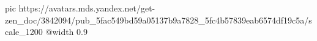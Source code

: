  
 
 
 
 

\ifcmt
  pic https://avatars.mds.yandex.net/get-zen_doc/3842094/pub_5fac549bd59a05137b9a7828_5fc4b57839eab6574df19c5a/scale_1200
  @width 0.9
\fi

